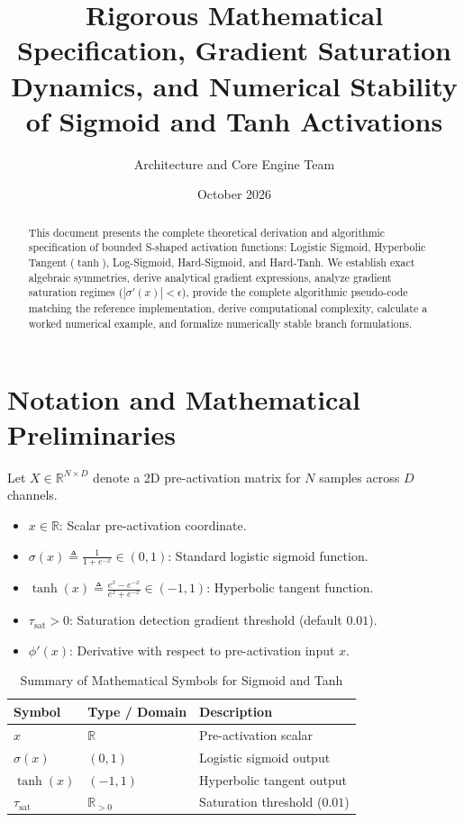 \documentclass[11pt,a4paper]{article}
\title{\textbf{Rigorous Mathematical Specification, Gradient Saturation Dynamics, and Numerical Stability of Sigmoid and Tanh Activations}}
\author{Architecture and Core Engine Team}
\date{October 2026}
\theoremstyle{definition}
\begin{document}
\maketitle

\begin{abstract}
This document presents the complete theoretical derivation and algorithmic specification of bounded S-shaped activation functions: Logistic Sigmoid, Hyperbolic Tangent ($\tanh$), Log-Sigmoid, Hard-Sigmoid, and Hard-Tanh. We establish exact algebraic symmetries, derive analytical gradient expressions, analyze gradient saturation regimes ($|\sigma'(x)| < \epsilon$), provide the complete algorithmic pseudo-code matching the reference implementation, derive computational complexity, calculate a worked numerical example, and formalize numerically stable branch formulations.
\end{abstract}

\section{Notation and Mathematical Preliminaries}

Let $X \in \mathbb{R}^{N \times D}$ denote a 2D pre-activation matrix for $N$ samples across $D$ channels.

\begin{itemize}
    \item $x \in \mathbb{R}$: Scalar pre-activation coordinate.
    \item $\sigma(x) \triangleq \frac{1}{1 + e^{-x}} \in (0, 1)$: Standard logistic sigmoid function.
    \item $\tanh(x) \triangleq \frac{e^x - e^{-x}}{e^x + e^{-x}} \in (-1, 1)$: Hyperbolic tangent function.
    \item $\tau_{\text{sat}} > 0$: Saturation detection gradient threshold (default $0.01$).
    \item $\phi'(x)$: Derivative with respect to pre-activation input $x$.
\end{itemize}

\begin{table}[h]
\centering
\caption{Summary of Mathematical Symbols for Sigmoid and Tanh}
\begin{tabular}{lll}
\toprule
\textbf{Symbol} & \textbf{Type / Domain} & \textbf{Description} \\
\midrule
$x$ & $\mathbb{R}$ & Pre-activation scalar \\
$\sigma(x)$ & $(0, 1)$ & Logistic sigmoid output \\
$\tanh(x)$ & $(-1, 1)$ & Hyperbolic tangent output \\
$\tau_{\text{sat}}$ & $\mathbb{R}_{> 0}$ & Saturation threshold ($0.01$) \\
\bottomrule
\end{tabular}
\end{table}
\end{document}
